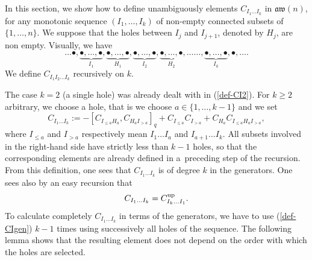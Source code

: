 \documentclass[pdftex]{sigma}
\numberwithin{equation}{section}
\theoremstyle{definition}
\newcommand{\aw}{\mathfrak{aw}(n)}
\begin{document}
In this section, we show how to define unambiguously elements $C_{I_1\dots I_k}$ in $\aw$, for any monotonic sequence $(I_1,\dots, I_k)$ of non-empty connected subsets of $\{1,\dots,n\}$.
We suppose that the holes between $I_{j}$ and $I_{j+1}$, denoted by $H_j$, are non empty.
Visually, we have
\[\ldots \bullet,\underbrace{\bullet,\dots,\bullet}_{I_1},\underbrace{\bullet,\dots,\bullet}_{H_1},\underbrace{\bullet,\dots,\bullet}_{I_2},\underbrace{\bullet,\dots,\bullet}_{H_2},\ldots\ldots ,\underbrace{\bullet,\dots,\bullet}_{I_{k}},\bullet,\ldots .\]
We define $C_{I_1I_2\dots I_k}$ recursively on $k$.



The case $k=2$ (a single hole) was already dealt with in (\ref{def-CI2}). For $k\geq 2$ arbitrary, we choose a hole, that is we choose $a\in\{1,\dots,k-1\}$ and we set
\begin{equation}\label{def-CIgen}
C_{I_1\dots I_k}:=-[C_{I_{\leq a}H_a},C_{H_aI_{>a}}]_q+C_{I_{\leq a}}C_{I_{>a}}+C_{H_a}C_{I_{\leq a}H_aI_{>a}} ,
\end{equation}
where $I_{\leq a}$ and $I_{>a}$ respectively mean $I_1\dots I_a$ and $I_{a+1}\dots I_k$. All subsets involved in the right-hand side have strictly less than $k-1$ holes,
so that the corresponding elements are already defined in a~preceding step of the recursion.
From this definition, one sees that $C_{I_1\dots I_k}$ is of degree $k$ in the generators. One sees also by an easy recursion that
\[ C_{I_1\dots I_k}=C_{I_k\dots I_1}^{\rm up} .\]
To calculate completely $C_{I_1\dots I_k}$ in terms of the generators, we have to use (\ref{def-CIgen}) $k-1$ times using successively all holes of the sequence.
The following lemma shows that the resulting element does not depend on the order with which the holes are selected.
\end{document}
